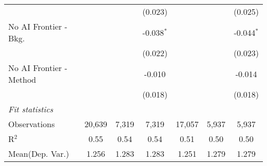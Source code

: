 \begin{tabular}{lcccccc}
                           &               &         & (0.023)       &               &         & (0.025)\\   
   No AI Frontier - Bkg.   &               &         & -0.038$^{*}$  &               &         & -0.044$^{*}$\\   
                           &               &         & (0.022)       &               &         & (0.023)\\   
   No AI Frontier - Method &               &         & -0.010        &               &         & -0.014\\   
                           &               &         & (0.018)       &               &         & (0.018)\\   
   \midrule
   \emph{Fit statistics}\\
   Observations            & 20,639        & 7,319   & 7,319         & 17,057        & 5,937   & 5,937\\  
   R$^2$                   & 0.55          & 0.54    & 0.54          & 0.51          & 0.50    & 0.50\\  
Mean(Dep. Var.) & 1.256 & 1.283 & 1.283 & 1.251 & 1.279 & 1.279 \\
   

\end{tabular}
